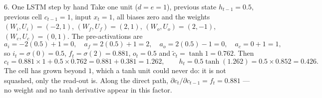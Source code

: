 \documentclass[11pt]{article}
\begin{document}
\begin{worked}{6. One LSTM step by hand}
Take one unit ($d = e = 1$), previous state $h_{t-1} = 0.5$, previous cell $c_{t-1} = 1$, input $x_t = 1$, all biases zero
and the weights $(W_i, U_i) = (-2, 1)$, $(W_f, U_f) = (2, 1)$, $(W_o, U_o) = (2, -1)$, $(W_c, U_c) = (0, 1)$. The
pre-activations are
\[
  a_i = -2(0.5) + 1 = 0, \quad a_f = 2(0.5) + 1 = 2, \quad a_o = 2(0.5) - 1 = 0, \quad a_c = 0 + 1 = 1 ,
\]
so $i_t = \sigma(0) = 0.5$, $f_t = \sigma(2) = 0.881$, $o_t = 0.5$ and $\tilde c_t = \tanh 1 = 0.762$. Then
\[
  c_t = 0.881 \times 1 + 0.5 \times 0.762 = 0.881 + 0.381 = 1.262, \qquad h_t = 0.5\tanh(1.262) = 0.5 \times 0.852 = 0.426 .
\]
The cell has grown beyond $1$, which a tanh unit could never do: it is not squashed, only the read-out is. Along the
direct path, $\partial c_t/\partial c_{t-1} = f_t = 0.881$ --- no weight and no tanh derivative appear in this factor.
\end{worked}
\end{document}
